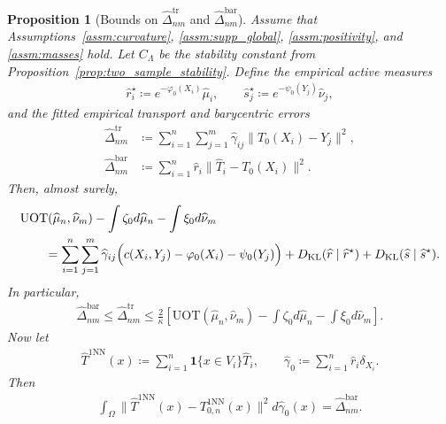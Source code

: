 \documentclass[11pt,reqno]{amsart}
\newtheorem{proposition}[theorem]{Proposition}
\theoremstyle{definition}
\newcommand{\KL}{\mathrm{KL}}
\renewcommand{\hat}{\widehat}
\begin{document}
\begin{proposition}[Bounds on $\hat\Delta_{nm}^{\mathrm{tr}}$ and $\hat\Delta_{nm}^{\mathrm{bar}}$]
\label{prop:uot_barycentric_and_1nn_estimated_mass}
Assume that Assumptions~\ref{assm:curvature}, \ref{assm:supp_global}, \ref{assm:positivity}, and \ref{assm:masses} hold.
Let $C_\Lambda$ be the stability constant from Proposition~\ref{prop:two_sample_stability}.
Define the empirical active measures
\begin{align}
    \hat r_i^\star \coloneqq e^{-\varphi_0(X_i)}\hat\mu_i,
    \qquad
    \hat s_j^\star \coloneqq e^{-\psi_0(Y_j)}\hat\nu_j,
\end{align}
and the fitted empirical transport and barycentric errors
\begin{align}
    \hat\Delta_{nm}^{\mathrm{tr}}
    &\coloneqq
    \sum_{i=1}^n\sum_{j=1}^m
    \hat\gamma_{ij}\|T_0(X_i)-Y_j\|^2, \\
    \hat\Delta_{nm}^{\mathrm{bar}}
    &\coloneqq
    \sum_{i=1}^n \hat r_i \|\hat T_i-T_0(X_i)\|^2.
\end{align}
Then, almost surely,
\begin{equation}
\label{eq:uot_hat_exact_empirical_excess}
\begin{aligned}
&\mathrm{UOT}(\hat\mu_n,\hat\nu_m)
- \int \zeta_0   d\hat\mu_n
- \int \xi_0   d\hat\nu_m \\
&\qquad=
\sum_{i=1}^n\sum_{j=1}^m
\hat\gamma_{ij}
\Bigl(
c(X_i,Y_j)-\varphi_0(X_i)-\psi_0(Y_j)
\Bigr)
+ {D_\KL}(\hat r \mid \hat r^\star)
+ {D_\KL}(\hat s \mid \hat s^\star).
\end{aligned}
\end{equation}
In particular,
\begin{align}
\label{eq:uot_hat_barycentric_delta_bound}
    \hat\Delta_{nm}^{\mathrm{bar}}
    \le
    \hat\Delta_{nm}^{\mathrm{tr}}
    \le
    \frac{2}{\kappa}
    \left[
        \mathrm{UOT}(\hat\mu_n,\hat\nu_m)
        - \int \zeta_0   d\hat\mu_n
        - \int \xi_0   d\hat\nu_m
    \right].
\end{align}
Now let
\begin{align}
    \hat T^{\mathrm{1NN}}(x)
    \coloneqq
    \sum_{i=1}^n \mathbf{1}\{x\in V_i\}\hat T_i,
    \qquad
    \hat\gamma_0 \coloneqq \sum_{i=1}^n \hat r_i \delta_{X_i}.
\end{align}
Then
\begin{align}
\label{eq:uot_hat_1nn_identity_active_empirical}
    \int_\Omega \|\hat T^{\mathrm{1NN}}(x)-T_{0,n}^{\mathrm{1NN}}(x)\|^2   d\hat\gamma_0(x)
    =
    \hat\Delta_{nm}^{\mathrm{bar}}.

\end{align}
\end{proposition}
\end{document}
